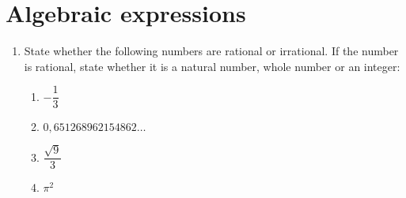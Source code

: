 \chapter{Algebraic expressions}
\begin{exercises}{}{
\begin{enumerate}[itemsep=5pt, label=\textbf{\arabic*}. ] 
\item State whether the following numbers are rational or irrational. If the number is rational, state whether it is a natural number, whole number or an integer:
\begin{enumerate}[itemsep=5pt, label=\textbf{(\alph*)} ] 
    \item $-\dfrac{1}{3}$
    \item $0,651268962154862\ldots$
    \item $\dfrac{\sqrt{9}}{3}$
    \item $\pi^2$
\end{enumerate}



\end{enumerate}}
\end{exercises}

